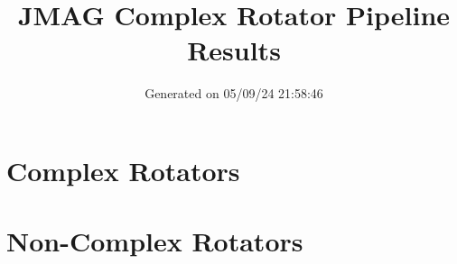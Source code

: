 \documentclass{report}%
\title{JMAG Complex Rotator Pipeline Results}%
\date{Generated on 05/09/24 21:58:46}%
\begin{document}
%
\normalsize%
\maketitle%
\tableofcontents%
\chapter{Complex Rotators}%
\label{chap:ComplexRotators}%

%
\chapter{Non{-}Complex Rotators}%
\label{chap:Non{-}ComplexRotators}%

%
\end{document}
